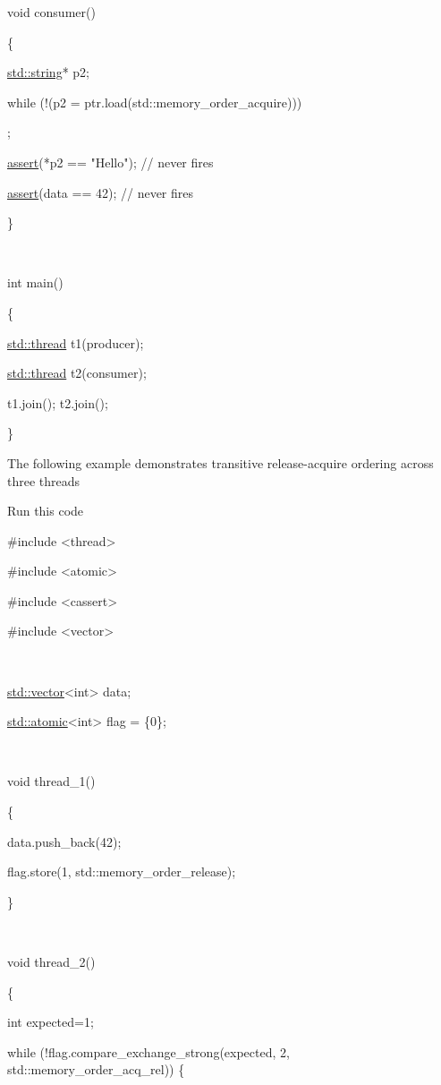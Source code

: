 \documentclass[
]{article}
\begin{document}
void consumer()

\{

\href{http://en.cppreference.com/w/cpp/string/basic_string}{std::string}*
p2;

while (!(p2 = ptr.load(std::memory\_order\_acquire)))

;

\href{http://en.cppreference.com/w/cpp/error/assert}{assert}(*p2 ==
"Hello"); // never fires

\href{http://en.cppreference.com/w/cpp/error/assert}{assert}(data ==
42); // never fires

\}

~

int main()

\{

\href{http://en.cppreference.com/w/cpp/thread/thread}{std::thread}
t1(producer);

\href{http://en.cppreference.com/w/cpp/thread/thread}{std::thread}
t2(consumer);

t1.join(); t2.join();

\}

The following example demonstrates transitive release-acquire ordering
across three threads

Run this code

\#include \textless thread\textgreater{}

\#include \textless atomic\textgreater{}

\#include \textless cassert\textgreater{}

\#include \textless vector\textgreater{}

~

\href{http://en.cppreference.com/w/cpp/container/vector}{std::vector}\textless int\textgreater{}
data;

\href{http://en.cppreference.com/w/cpp/atomic/atomic}{std::atomic}\textless int\textgreater{}
flag = \{0\};

~

void thread\_1()

\{

data.push\_back(42);

flag.store(1, std::memory\_order\_release);

\}

~

void thread\_2()

\{

int expected=1;

while (!flag.compare\_exchange\_strong(expected, 2,
std::memory\_order\_acq\_rel)) \{
\end{document}
